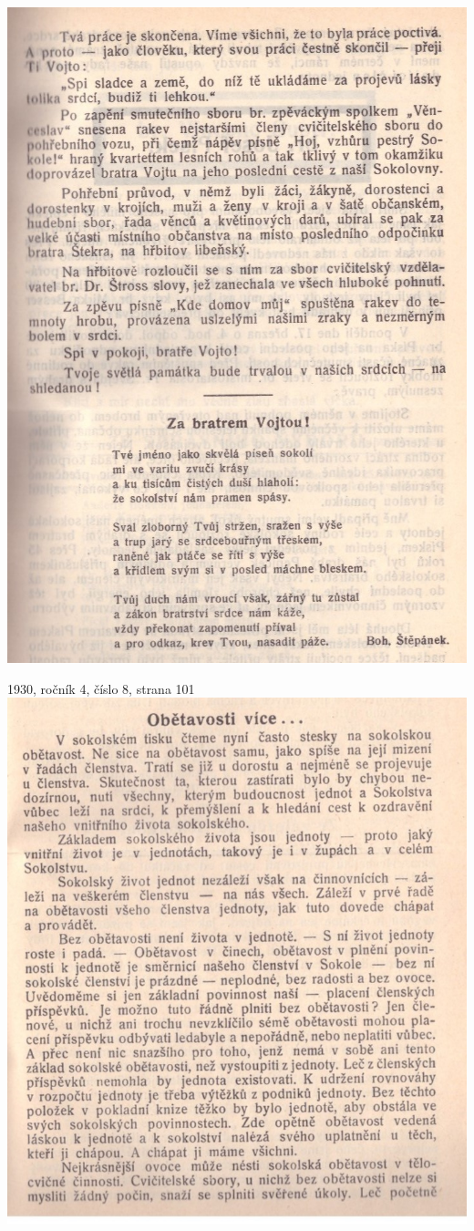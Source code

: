 \documentclass[11pt]{article}
\begin{document}
\includegraphics[width=\imagewidth]{original/1930/Skener_20250407 (4).jpg}

1930, ročník 4, číslo 8, strana 101 \\
\includegraphics[width=\imagewidth]{original/1930/Skener_20250316 (10).jpg}
\end{document}
